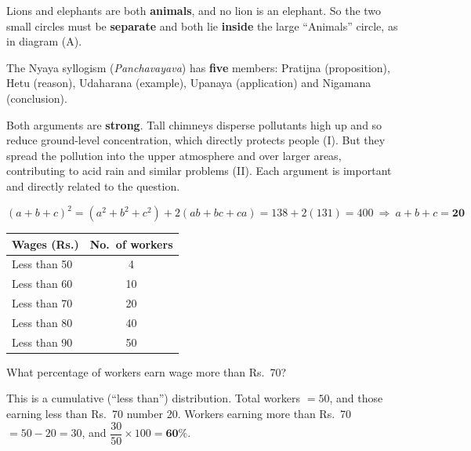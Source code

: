 Lions and elephants are both \textbf{animals}, and no lion is an elephant. So the two small circles must be \textbf{separate} and both lie \textbf{inside} the large ``Animals'' circle, as in diagram (A).
\begin{center}
\end{center}

The Nyaya syllogism (\emph{Panchavayava}) has \textbf{five} members: Pratijna (proposition), Hetu (reason), Udaharana (example), Upanaya (application) and Nigamana (conclusion).

Both arguments are \textbf{strong}. Tall chimneys disperse pollutants high up and so reduce ground-level concentration, which directly protects people (I). But they spread the pollution into the upper atmosphere and over larger areas, contributing to acid rain and similar problems (II). Each argument is important and directly related to the question.

\[(a+b+c)^2=(a^2+b^2+c^2)+2(ab+bc+ca)=138+2(131)=400\ \Rightarrow\ a+b+c=\mathbf{20}\]

\begin{tabular}{lc}\toprule \textbf{Wages (Rs.)} & \textbf{No.\ of workers}\\\midrule
Less than 50 & 4\\ Less than 60 & 10\\ Less than 70 & 20\\ Less than 80 & 40\\ Less than 90 & 50\\\bottomrule\end{tabular}

What percentage of workers earn wage more than Rs.~70?

This is a cumulative (``less than'') distribution. Total workers $=50$, and those earning less than Rs.~70 number 20.
Workers earning more than Rs.~70 $=50-20=30$, and $\dfrac{30}{50}\times100=\mathbf{60\%}$.


